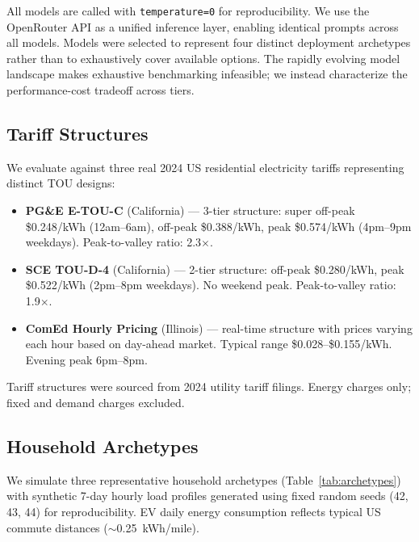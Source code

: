 \documentclass[conference]{IEEEtran}
\begin{document}
All models are called with \texttt{temperature=0} for reproducibility.
We use the OpenRouter API as a unified inference layer, enabling identical
prompts across all models.
Models were selected to represent four distinct deployment archetypes
rather than to exhaustively cover available options.
The rapidly evolving model landscape makes exhaustive benchmarking
infeasible; we instead characterize the performance-cost tradeoff
across tiers.

\subsection{Tariff Structures}
\label{subsec:tariffs}

We evaluate against three real 2024 US residential electricity tariffs
representing distinct TOU designs:

\begin{itemize}
  \item \textbf{PG\&E E-TOU-C} (California) --- 3-tier structure:
    super off-peak \$0.248/kWh (12am--6am), off-peak \$0.388/kWh,
    peak \$0.574/kWh (4pm--9pm weekdays). Peak-to-valley ratio: 2.3$\times$.

  \item \textbf{SCE TOU-D-4} (California) --- 2-tier structure:
    off-peak \$0.280/kWh, peak \$0.522/kWh (2pm--8pm weekdays).
    No weekend peak. Peak-to-valley ratio: 1.9$\times$.

  \item \textbf{ComEd Hourly Pricing} (Illinois) --- real-time structure
    with prices varying each hour based on day-ahead market.
    Typical range \$0.028--\$0.155/kWh. Evening peak 6pm--8pm.
\end{itemize}

Tariff structures were sourced from 2024 utility tariff filings.
Energy charges only; fixed and demand charges excluded.

\subsection{Household Archetypes}
\label{subsec:households}

We simulate three representative household archetypes (Table~\ref{tab:archetypes})
with synthetic 7-day hourly load profiles generated using fixed random
seeds (42, 43, 44) for reproducibility.
EV daily energy consumption reflects typical US commute distances
($\sim$0.25~kWh/mile).
\end{document}

